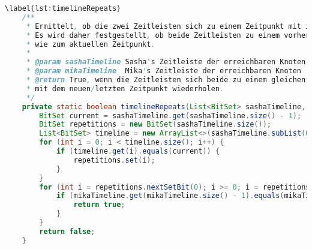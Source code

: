 \documentclass[a4paper,10pt,ngerman]{scrartcl}
\begin{document}
    \begin{lstlisting}[frame=single,language=Java,title=Methode timelineRepeats,breaklines=true]
    \label{lst:timelineRepeats}
    /**
     * Ermittelt, ob die zwei Zeitleisten sich zu einem Zeitpunkt mit ihrem letzten Eintrag wiederholen.
     * Es wird daher festgestellt, ob beide Zeitleisten zu einem vorherigen Zeitpunkt an den genau gleichen Knoten waren,
     * wie zum aktuellen Zeitpunkt.
     *
     * @param sashaTimeline Sasha's Zeitleiste der erreichbaren Knoten
     * @param mikaTimeline  Mika's Zeitleiste der erreichbaren Knoten
     * @return True, wenn die Zeitleisten sich beide zu einem gleichen Zeitpunkt
     * mit dem neuen/letzten Zeitpunkt wiederholen.
     */
    private static boolean timelineRepeats(List<BitSet> sashaTimeline, List<BitSet> mikaTimeline) {
        BitSet current = sashaTimeline.get(sashaTimeline.size() - 1);
        BitSet repetitions = new BitSet(sashaTimeline.size());
        List<BitSet> timeline = new ArrayList<>(sashaTimeline.subList(0, sashaTimeline.size() - 1));
        for (int i = 0; i < timeline.size(); i++) {
            if (timeline.get(i).equals(current)) {
                repetitions.set(i);
            }
        }
        for (int i = repetitions.nextSetBit(0); i >= 0; i = repetitions.nextSetBit(i + 1)) {
            if (mikaTimeline.get(mikaTimeline.size() - 1).equals(mikaTimeline.get(i))) {
                return true;
            }
        }
        return false;
    }
    \end{lstlisting}
\end{document}
